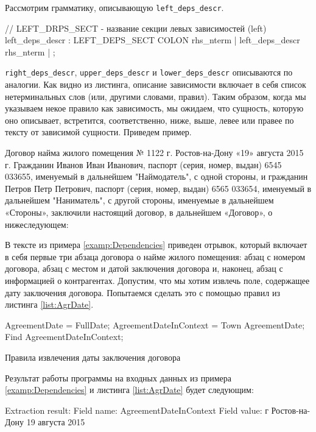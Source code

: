 Рассмотрим грамматику, описывающую \lstinline{left_deps_descr}.
\begin{Verb}
// LEFT_DRPS_SECT - название секции левых зависимостей (left)
left_deps_descr
    : LEFT_DEPS_SECT COLON rhs_nterm
    | left_deps_descr rhs_nterm
    | %
    ;
\end{Verb}
\lstinline{right_deps_descr}, \lstinline{upper_deps_descr} и \lstinline{lower_deps_descr} описываются по аналогии. Как видно из листинга, описание зависимости включает в себя список нетерминальных слов (или, другими словами, правил). Таким образом, когда мы указываем некое правило как зависимость, мы ожидаем, что сущность, которую оно описывает, встретится, соответственно, ниже, выше, левее или правее по тексту от зависимой сущности. Приведем пример.
\begin{myexample}
Договор найма жилого помещения № 1122\newline
г. Ростов-на-Дону «19» августа 2015 г.\newline
Гражданин Иванов Иван Иванович, паспорт (серия, номер, выдан) 6545 033655, именуемый в дальнейшем "Наймодатель", с одной стороны, и гражданин Петров Петр Петрович, паспорт (серия, номер, выдан) 6565 033654, именуемый в дальнейшем "Наниматель", с другой стороны, именуемые в дальнейшем «Стороны», заключили настоящий договор, в дальнейшем «Договор», о нижеследующем: 
\label{examp:Dependencies}
\end{myexample}
В тексте из примера \ref{examp:Dependencies} приведен отрывок, который включает в себя первые три абзаца договора о найме жилого помещения: абзац с номером договора, абзац с местом и датой заключения договора и, наконец, абзац с информацией о контрагентах. Допустим, что мы хотим извлечь поле, содержащее дату заключения договора. Попытаемся сделать это с помощью правил из листинга \ref{list:AgrDate}.
\begin{ListingEnv}
\begin{Verb}
AgreementDate = FullDate;
AgreementDateInContext = Town AgreementDate;
Find AgreementDateInContext;
\end{Verb}
\caption{Правила извлечения даты заключения договора}
\label{list:AgrDate}
\end{ListingEnv}
Результат работы программы на входных данных из примера \ref{examp:Dependencies} и листинга \ref{list:AgrDate} будет следующим:
\begin{Verb}
Extraction result:
Field name: AgreementDateInContext
Field value: г Ростов-на-Дону 19 августа 2015
\end{Verb}
